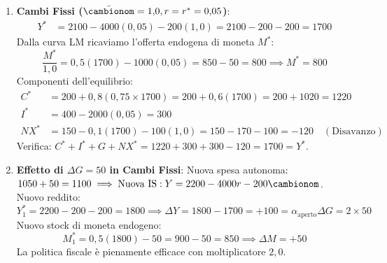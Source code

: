 \begin{esercizio}
\begin{enumerate}
    \item \textbf{Cambi Fissi ($\bar{\cambionom} = 1{,}0, r = r^* = 0{,}05$)}:
    \begin{align*}
        Y^* &= 2100 - 4000(0{,}05) - 200(1{,}0) = 2100 - 200 - 200 = 1700
    \end{align*}
    Dalla curva LM ricaviamo l'offerta endogena di moneta $M^*$:
    \begin{equation*}
        \frac{M^*}{1{,}0} = 0{,}5(1700) - 1000(0{,}05) = 850 - 50 = 800 \implies M^* = 800
    \end{equation*}
    Componenti dell'equilibrio:
    \begin{align*}
        C^* &= 200 + 0{,}8(0{,}75 \times 1700) = 200 + 0{,}6(1700) = 200 + 1020 = 1220 \\
        I^* &= 400 - 2000(0{,}05) = 300 \\
        NX^* &= 150 - 0{,}1(1700) - 100(1{,}0) = 150 - 170 - 100 = -120 \quad (\text{Disavanzo})
    \end{align*}
    Verifica: $C^* + I^* + G + NX^* = 1220 + 300 + 300 - 120 = 1700 = Y^*$.

    \item \textbf{Effetto di $\Delta G = 50$ in Cambi Fissi}:
    Nuova spesa autonoma: $1050 + 50 = 1100 \implies \text{Nuova IS}: Y = 2200 - 4000 r - 200 \cambionom$.
    Nuovo reddito:
    \begin{equation*}
        Y_1^* = 2200 - 200 - 200 = 1800 \implies \Delta Y = 1800 - 1700 = +100 = \alpha_{\text{aperto}} \Delta G = 2 \times 50
    \end{equation*}
    Nuovo stock di moneta endogeno:
    \begin{equation*}
        M_1^* = 0{,}5(1800) - 50 = 900 - 50 = 850 \implies \Delta M = +50
    \end{equation*}
    La politica fiscale è pienamente efficace con moltiplicatore $2{,}0$.


\end{enumerate}
\end{esercizio}

